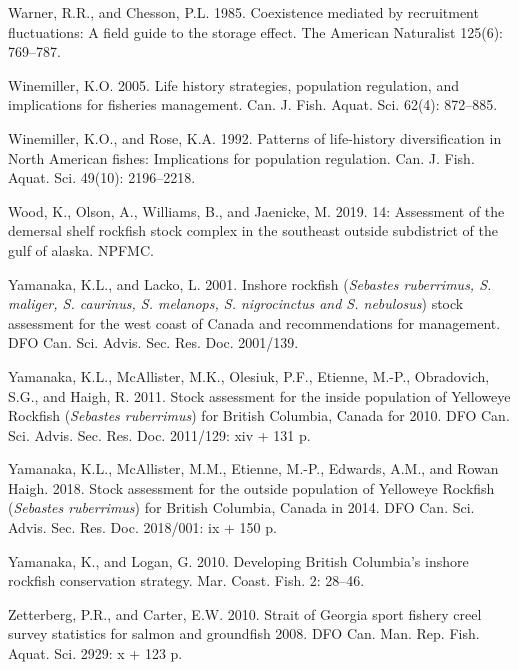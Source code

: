 \documentclass[11pt]{book}
\begin{document}
\leavevmode\hypertarget{ref-warner1985}{}%
Warner, R.R., and Chesson, P.L. 1985. Coexistence mediated by recruitment fluctuations: A field guide to the storage effect. The American Naturalist 125(6): 769--787.

\leavevmode\hypertarget{ref-winemiller2005}{}%
Winemiller, K.O. 2005. Life history strategies, population regulation, and implications for fisheries management. Can. J. Fish. Aquat. Sci. 62(4): 872--885.

\leavevmode\hypertarget{ref-winemiller1992}{}%
Winemiller, K.O., and Rose, K.A. 1992. Patterns of life-history diversification in North American fishes: Implications for population regulation. Can. J. Fish. Aquat. Sci. 49(10): 2196--2218.

\leavevmode\hypertarget{ref-wood2019}{}%
Wood, K., Olson, A., Williams, B., and Jaenicke, M. 2019. 14: Assessment of the demersal shelf rockfish stock complex in the southeast outside subdistrict of the gulf of alaska. NPFMC.

\leavevmode\hypertarget{ref-yamanaka2001}{}%
Yamanaka, K.L., and Lacko, L. 2001. Inshore rockfish (\emph{Sebastes ruberrimus, S. maliger, S. caurinus, S. melanops, S. nigrocinctus and S. nebulosus}) stock assessment for the west coast of Canada and recommendations for management. DFO Can. Sci. Advis. Sec. Res. Doc. 2001/139.

\leavevmode\hypertarget{ref-yamanaka2011}{}%
Yamanaka, K.L., McAllister, M.K., Olesiuk, P.F., Etienne, M.-P., Obradovich, S.G., and Haigh, R. 2011. Stock assessment for the inside population of Yelloweye Rockfish (\emph{Sebastes ruberrimus}) for British Columbia, Canada for 2010. DFO Can. Sci. Advis. Sec. Res. Doc. 2011/129: xiv + 131 p.

\leavevmode\hypertarget{ref-yamanaka2018yelloweyeoutside}{}%
Yamanaka, K.L., McAllister, M.M., Etienne, M.-P., Edwards, A.M., and Rowan Haigh. 2018. Stock assessment for the outside population of Yelloweye Rockfish (\emph{Sebastes ruberrimus}) for British Columbia, Canada in 2014. DFO Can. Sci. Advis. Sec. Res. Doc. 2018/001: ix + 150 p.

\leavevmode\hypertarget{ref-yamanaka2010}{}%
Yamanaka, K., and Logan, G. 2010. Developing British Columbia's inshore rockfish conservation strategy. Mar. Coast. Fish. 2: 28--46.

\leavevmode\hypertarget{ref-zetterberg2010}{}%
Zetterberg, P.R., and Carter, E.W. 2010. Strait of Georgia sport fishery creel survey statistics for salmon and groundfish 2008. DFO Can. Man. Rep. Fish. Aquat. Sci. 2929: x + 123 p.
\end{document}
